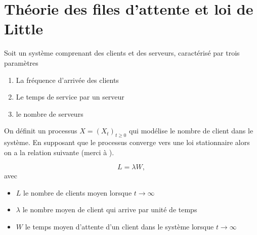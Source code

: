 \section{Théorie des files d'attente et loi de Little}
Soit un système comprenant des clients et des serveurs, caractérisé par trois paramètres
\begin{enumerate}
    \item La fréquence d'arrivée des clients
    \item Le temps de service par un serveur
    \item le nombre de serveurs 
\end{enumerate}
On définit un processus $X = (X_t)_{t\geq 0}$ qui modélise le nombre de client dans le système. En supposant que le processus converge vers une loi stationnaire alors on a la relation suivante (merci à \citet{Little1961}).
\begin{theo}
$$L = \lambda W,$$
avec 
\begin{itemize}
    \item $L$ le nombre de clients moyen lorsque $t\rightarrow \infty$
    \item $\lambda$ le nombre moyen de client qui arrive par unité de temps
    \item $W$ le temps moyen d'attente d'un client dans le système lorsque $t\rightarrow \infty$
\end{itemize}
\end{theo}
